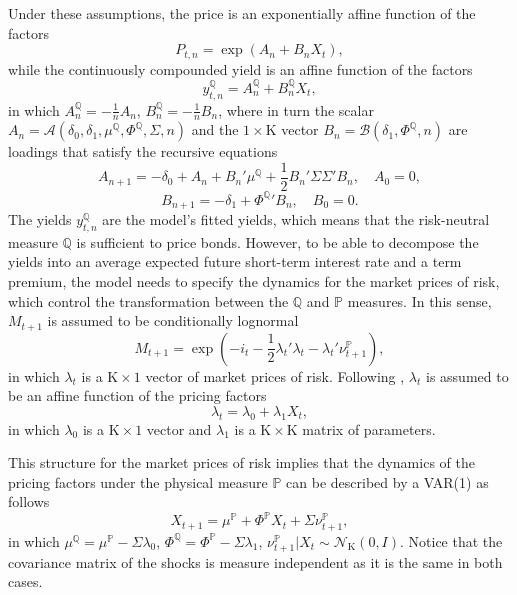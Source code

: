\documentclass[a4paper, 12pt]{article}
\providecommand{\tnr}{n}
\providecommand{\idxt}{t}
\providecommand{\idxs}{\idxt,\tnr}
\providecommand{\yld}{y}
\providecommand{\yZero}{\yld_{\idxs}}
\providecommand{\yZeroQ}{\yZero^{\Qmeasure}}
\providecommand{\Pzero}{P_{\idxs}}
\providecommand{\srate}{i}
\providecommand{\shortrate}{\srate_{\idxt}}
\providecommand{\SDF}{M_{\idxt+1}}
\providecommand{\Xvars}{X_{\idxt}}
\providecommand{\XvarsFwd}{X_{\idxt+1}}
\providecommand{\affineA}{A_{\tnr}}
\providecommand{\affineB}{B_{\tnr}}
\providecommand{\affineAfwd}{A_{\tnr + 1}}
\providecommand{\affineBfwd}{B_{\tnr + 1}}
\providecommand{\affineAQ}{\affineA^{\Qmeasure}}
\providecommand{\affineBQ}{\affineB^{\Qmeasure}}
\providecommand{\Xdim}{\mathrm{K}}
\providecommand{\Normal}{\mathcal{N}}
\providecommand{\Pmeasure}{\mathbb{P}}
\providecommand{\Qmeasure}{\mathbb{Q}}
\providecommand{\riskprice}{\lambda_{t}}
\providecommand{\lambdazero}{\lambda_{0}}
\providecommand{\lambdaone}{\lambda_{1}}
\providecommand{\deltazero}{\delta_{0}}
\providecommand{\deltaone}{\delta_{1}}
\providecommand{\error}{\nu_{t+1}}
\providecommand{\errorP}{\error^{\Pmeasure}}
\providecommand{\XmuP}{\mu^{\Pmeasure}}
\providecommand{\XmuQ}{\mu^{\Qmeasure}}
\providecommand{\XSigma}{\Sigma}
\providecommand{\XPhiP}{\Phi^{\Pmeasure}}
\providecommand{\XPhiQ}{\Phi^{\Qmeasure}}
\newcommand{\eqyZeroQ}{\yZeroQ = \affineAQ + \affineBQ \Xvars}
\newcommand{\eqXvarsFwdP}{\XvarsFwd = \XmuP + \XPhiP \Xvars  + \XSigma \errorP}
\newcommand{\eqriskprice}{\riskprice = \lambdazero + \lambdaone \Xvars}
\newcommand{\eqSDF}{\SDF = \exp\left( -\shortrate -\frac{1}{2} \riskprice' \riskprice - \riskprice' \errorP \right)}
\begin{document}
Under these assumptions, the price is an exponentially affine function of the factors
\begin{equation*}
\Pzero = \exp\left( \affineA + \affineB \Xvars \right) ,
\end{equation*}
\noindent while the continuously compounded yield is an affine function of the factors
\begin{equation} \label{eq:nYaffineQ}
\eqyZeroQ ,
\end{equation}
\noindent in which \(\affineAQ = - \frac{1}{\tnr} \affineA\), \(\affineBQ = - \frac{1}{\tnr} \affineB\), where in turn the scalar \(\affineA = \mathcal{A}(\deltazero, \deltaone, \XmuQ, \XPhiQ, \XSigma, \tnr)\) and the \(1 \times \Xdim\) vector \(\affineB = \mathcal{B}(\deltaone, \XPhiQ, \tnr)\) are loadings that satisfy the recursive equations
\begin{equation} \label{eq:nAffineA}
\affineAfwd = - \deltazero + \affineA + \affineB' \XmuQ + \frac{1}{2} \affineB' \XSigma \XSigma' \affineB , \quad A_{0} = 0 ,
\end{equation}
\vspace{-.7cm}
\begin{equation} \label{eq:nAffineB}
\affineBfwd = - \deltaone + \XPhiQ{'} \affineB , \quad B_{0} = 0 .
\end{equation}
The yields \(\yZeroQ\) are the model's fitted yields, which means that the risk-neutral measure \(\Qmeasure\) is sufficient to price bonds. However, to be able to decompose the yields into an average expected future short-term interest rate and a term premium, the model needs to specify the dynamics for the market prices of risk, which control the transformation between the \(\Qmeasure\) and \(\Pmeasure\) measures. In this sense, \(\SDF\) is assumed to be conditionally lognormal
\begin{equation} \label{eq:nSDF}
\eqSDF ,
\end{equation}
\noindent in which \(\riskprice\) is a \(\Xdim \times 1\) vector of market prices of risk. Following \cite{Duffee:2002}, \(\riskprice\) is assumed to be an affine function of the pricing factors
\begin{equation} \label{eq:nRiskprice}
\eqriskprice ,
\end{equation}
\noindent in which \(\lambdazero\) is a \(\Xdim \times 1\) vector and \(\lambdaone\) is a \(\Xdim \times \Xdim\) matrix of parameters.

This structure for the market prices of risk implies that the dynamics of the pricing factors under the physical measure \(\Pmeasure\) can be described by a VAR(1) as follows
\begin{equation} \label{eq:nXvarsP}
\eqXvarsFwdP ,
\end{equation}
\noindent in which \(\XmuQ = \XmuP - \XSigma \lambdazero\), \(\XPhiQ = \XPhiP - \XSigma \lambdaone\),  \(\errorP | \Xvars \sim \Normal_{\Xdim} \left(0,I\right)\). Notice that the covariance matrix of the shocks is measure independent as it is the same in both cases. 
\end{document}
